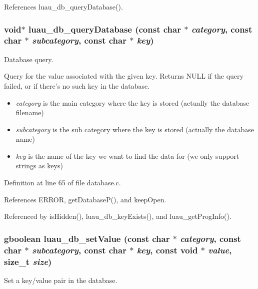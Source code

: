 References luau\_\-db\_\-query\-Database().
\subsubsection{\setlength{\rightskip}{0pt plus 5cm}void$\ast$ luau\_\-db\_\-query\-Database (const char $\ast$ {\em category}, const char $\ast$ {\em subcategory}, const char $\ast$ {\em key})}\label{database_8h_a1}


Database query. 

Query for the value associated with the given key. Returns NULL if the query failed, or if there's no such key in the database.

\begin{itemize}
\item {\em category\/} is the main category where the key is stored (actually the database filename) \item {\em subcategory\/} is the sub category where the key is stored (actually the database name) \item {\em key\/} is the name of the key we want to find the data for (we only support strings as keys) 
\end{itemize}


Definition at line 65 of file database.c.

References ERROR, get\-Database\-P(), and keep\-Open.

Referenced by is\-Hidden(), luau\_\-db\_\-key\-Exists(), and luau\_\-get\-Prog\-Info().
\subsubsection{\setlength{\rightskip}{0pt plus 5cm}gboolean luau\_\-db\_\-set\-Value (const char $\ast$ {\em category}, const char $\ast$ {\em subcategory}, const char $\ast$ {\em key}, const void $\ast$ {\em value}, size\_\-t {\em size})}\label{database_8h_a5}


Set a key/value pair in the database. 

